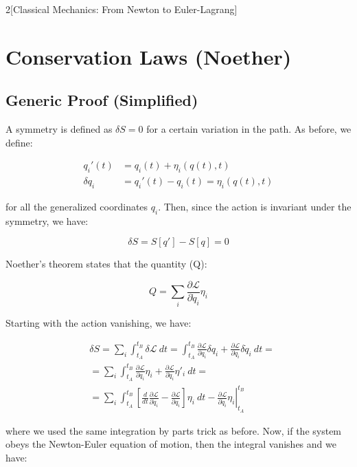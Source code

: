 \documentclass{article}
\begin{document}
\begin{multicols}{2}[Classical Mechanics: From Newton to Euler-Lagrang]
\section{Conservation Laws (Noether)}
\subsection{Generic Proof (Simplified)}
A symmetry is defined as $\delta S = 0$ for a certain variation in the path. As before, we define:

\begin{align*}
    q_i'(t) &= q_i(t) + \eta_i(q(t), t) \\
    \delta q_i &= q_i'(t) - q_i(t) = \eta_i(q(t), t)
\end{align*}

for all the generalized coordinates $q_i$. Then, since the action is invariant under the symmetry, we have:

\begin{equation*}
    \delta S = S[q'] - S[q] = 0
\end{equation*}

Noether's theorem states that the quantity (Q):

\begin{equation*}
    Q = \sum_i \frac{\partial \mathcal{L}}{\partial \dot{q}_i} \eta_i
\end{equation*}

Starting with the action vanishing, we have:

\begin{align*}
    &\delta S = \sum_i \int_{t_A}^{t_B} \delta \mathcal{L}\ dt
         = \int_{t_A}^{t_B} \frac{\partial \mathcal{L}}{\partial q_i} \delta q_i + \frac{\partial \mathcal{L}}{\partial \dot{q}_i} \delta \dot{q}_i\ dt = \\
    &= \sum_i \int_{t_A}^{t_B} \frac{\partial \mathcal{L}}{\partial q_i} \eta_i + \frac{\partial \mathcal{L}}{\partial \dot{q}_i} \eta'_i \ dt = \\
    &= \sum_i \int_{t_A}^{t_B} \left[ \frac{d}{dt} \frac{\partial \mathcal{L}}{\partial \dot{q}_i} - \frac{\partial \mathcal{L}}{\partial q_i} \right] \eta_i\ dt - \left. \frac{\partial \mathcal{L}}{\partial \dot{q}_i} \eta_i \right\vert_{t_A}^{t_B}
\end{align*}

where we used the same integration by parts trick as before. Now, if the system obeys the Newton-Euler equation of motion, then the integral vanishes and we have:


\end{multicols}
\end{document}
